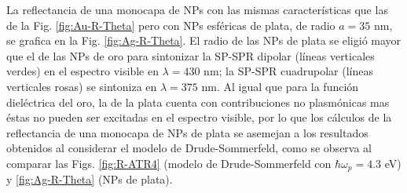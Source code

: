 La reflectancia de una monocapa de NPs con las mismas características que las de la Fig. \ref{fig:Au-R-Theta} pero con NPs esféricas de plata, de radio $a=35$ nm, se grafica en la Fig. \ref{fig:Ag-R-Theta}. El radio de las NPs de plata se eligió mayor que el de las NPs de oro para sintonizar la SP-SPR dipolar (líneas verticales verdes) en el espectro visible en $\lambda=430$ nm; la SP-SPR cuadrupolar (líneas verticales rosas) se sintoniza en $\lambda=375$ nm. Al igual que para la función dieléctrica del oro, la de la plata cuenta con contribuciones no plasmónicas mas éstas no pueden ser excitadas en el espectro visible, por lo que los cálculos de la reflectancia de una monocapa de NPs de plata se asemejan a los resultados obtenidos al considerar el modelo de Drude-Sommerfeld, como se observa al comparar las Figs. \ref{fig:R-ATR4} (modelo de Drude-Sommerfeld con $\hbar\omega_p=4.3$ eV) y \ref{fig:Ag-R-Theta} (NPs de plata).

